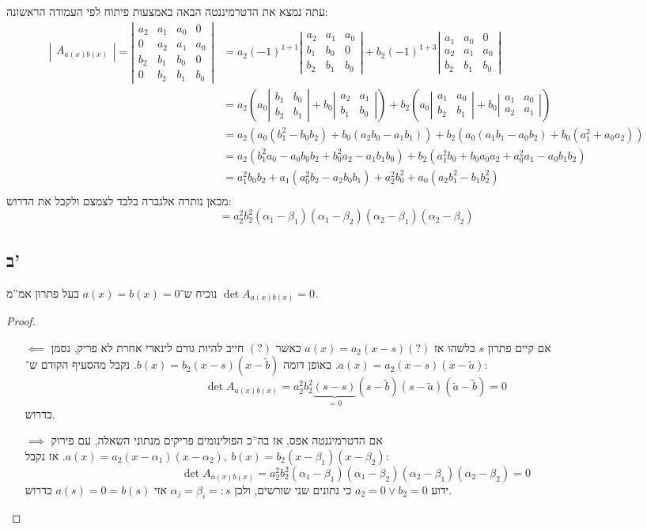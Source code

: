 \documentclass[]{article}
\newcommand\detms[1]    {\sof{\begin{matrix}
            #1
\end{matrix}}}
\newcommand\ag        {\alpha}
\newcommand\bg        {\beta}
\newcommand\tl    {\tilde}
\newcommand\sof[1]    {\left | #1 \right |}
\newcommand\cl [1]    {\left ( #1 \right )}
\theoremstyle{definition}
\begin{document}
    עתה נמצא את הדטרמיננטה הבאה באמצעות פיתוח לפי העמודה הראשונה: 
    \begin{align*}
        \detms{A_{a(x)b(x)}} = \detms{a_2 & a_1 & a_0 & 0 \\ 0 & a_2 & a_1 & a_0 \\ b_2 & b_1 & b_0 & 0 \\ 0 & b_2 & b_1 & b_0} &= a_2(-1)^{1 + 1}\detms{a_2 & a_1 & a_0 \\ b_1 & b_0 & 0 \\ b_2 & b_1 & b_0} + b_2(-1)^{1 + 3}\detms{a_1 & a_0 & 0 \\ a_2 & a_1 & a_0 \\ b_2 & b_1 & b_0} \\
        &= a_2\cl{a_0\detms{b_1 & b_0 \\ b_2 & b_1} + b_0\detms{a_2 & a_1 \\ b_1 & b_0}} + b_2\cl{a_0\detms{a_1 & a_0 \\ b_2 & b_1} + b_0\detms{a_1 & a_0 \\ a_2 & a_1}} \\
        &= a_2\cl{a_0(b_1^2 - b_0b_2) + b_0(a_2b_0 - a_1b_1)} + b_2(a_0(a_1b_1 - a_0b_2) + b_0(a_1^2 + a_0a_2))  \\
        &= {a_2(b_1^2a_0 - a_0b_0b_2 + b_0^2a_2 -a_1b_1b_0)} + {b_2(a_1^2b_0 + b_0a_0a_2 + a_0^2a_1- a_0b_1b_2)} \\
        &= a_1^2 b_0 b_2 + a_1 (a_0^2 b_2 - a_2 b_0 b_1) + a_2^2 b_0^2 + a_0 (a_2 b_1^2 - b_1 b_2^2) \\
    \end{align*}
    מכאן נותרה אלגברה בלבד לצמצם ולקבל את הדרוש: 
    \[ = a_2^2b_2^2(\ag_1 - \bg_1)(\ag_1 - \bg_2)(\ag_2 - \bg_1)(\ag_2 - \bg_2) \]
    
    \subsection*{ב'}
    נוכיח ש־$a(x) = b(x) = 0$ בעל פתרון אמ''מ $\det A_{a(x)b(x)} = 0$. \begin{proof}
        \begin{itemize}
            \item[$\impliedby$] אם קיים פתרון $s$ כלשהו אז $a(x) = a_2(x - s)(?)$ כאשר $(?)$ חייב להיות גורם לינארי אחרת לא פריק, נסמן $a(x) = a_2(x - s)(x - \tl a)$. באופן דומה $b(x) = b_2(x - s)(x - \tl b)$. נקבל מהסעיף הקודם ש־: 
            \[ \det A_{a(x)b(x)} = a_2^2b_2^2\underbrace{(s - s)}_{=0}(s - \tl b)(s - \tl a)(\tl a - \tl b) = 0 \]
            כדרוש. 
            \item[$\implies$] אם הדטרמיננטה אפס, אז בה''כ הפולינומים פריקים מנתוני השאלה, עם פירוק $a(x) = a_2(x - \ag_1)(x - \ag_2), \ b(x) = b_2(x - \bg_1)(x - \bg_2)$. אז נקבל: 
            \[ \det A_{a(x)b(x)} = a_2^2b_2^2(\ag_1 - \bg_1)(\ag_1 - \bg_2)(\ag_2 - \bg_1)(\ag_2 - \bg_2) = 0 \]
            ידוע $a_2 = 0 \lor b_2 = 0$ כי נתונים שני שורשים, ולכן $\ag_j = \bg_i =: s$ אזי $a(s) = 0 = b(s)$ כדרוש. 
                
        \end{itemize}
    \end{proof}
    
\end{document}

